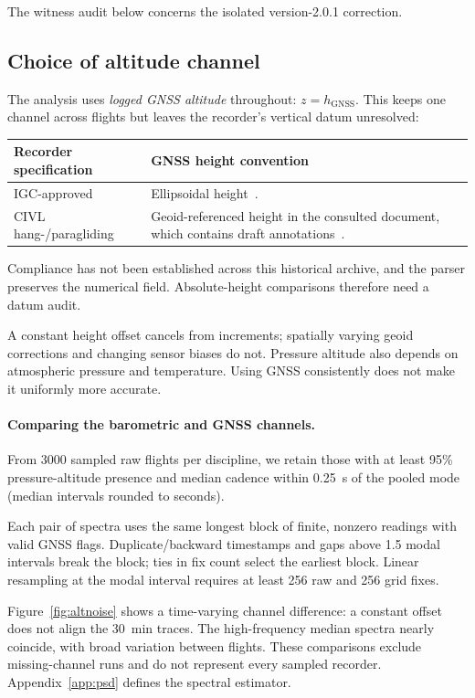 \fi
The witness audit below concerns the isolated version-2.0.1 correction.


\subsection{Choice of altitude channel}
\label{sec:altchannel}

The analysis uses \emph{logged GNSS altitude} throughout: $z=h_{\mathrm{GNSS}}$.
This keeps one channel across flights but leaves the recorder's vertical datum unresolved:
\begin{center}
\begin{tabularx}{\linewidth}{@{}l X@{}}
\toprule
\textbf{Recorder specification} & \textbf{GNSS height convention} \\
\midrule
IGC-approved & Ellipsoidal height~\cite{fai_igc_spec}. \\
CIVL hang-/paragliding & Geoid-referenced height in the consulted document,
which contains draft annotations~\cite{fai_civl_s7h_2024}. \\
\bottomrule
\end{tabularx}
\end{center}
Compliance has not been established across this historical archive, and the parser
preserves the numerical field. Absolute-height comparisons therefore need a datum audit.

A constant height offset cancels from increments; spatially varying geoid corrections
and changing sensor biases do not. Pressure altitude also depends on atmospheric
pressure and temperature. Using GNSS consistently does not make it uniformly more accurate.

\paragraph{Comparing the barometric and GNSS channels.}
From \num{3000} sampled raw flights per discipline, we retain those with at least
95\% pressure-altitude presence and median cadence within \SI{0.25}{\second}
of the pooled mode (median intervals rounded to seconds).

Each pair of spectra uses the same longest block of finite, nonzero readings with
valid GNSS flags. Duplicate/backward timestamps and gaps above 1.5 modal intervals
break the block; ties in fix count select the earliest block.
Linear resampling at the modal interval requires at least 256 raw and 256 grid fixes.

Figure~\ref{fig:altnoise} shows a time-varying channel difference: a constant offset
does not align the \SI{30}{\minute} traces. The high-frequency median spectra
nearly coincide, with broad variation between flights. These comparisons exclude
missing-channel runs and do not represent every sampled recorder.
Appendix~\ref{app:psd} defines the spectral estimator.

